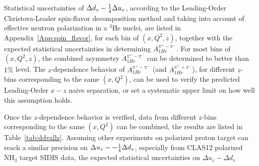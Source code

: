 Statistical uncertainties of $\Delta d_v-{1 \over 4} \Delta u_v$, according to the Leading-Order Christova-Leader spin-flavor decomposition method and taking into account of effective neutron polarization in a $^3$He nuclei, are listed in Appendix~\ref{App:spin_flavor}, for each bin of $(x, Q^2, z)$, together with the expected statistical uncertainties in determining  $A_{1He}^{\pi^+ - \pi^-}$. For most bins of $(x, Q^2, z)$, the combined asymmetry $A_{1He}^{\pi^+ - \pi^-}$ can be determined to better than $1\%$ level. The $z$-dependence behavior of  $A_{1He}^{\pi^+ - \pi^-}$ (and $A_{1He}^{\pi^+ + \pi^-}$), for different $z$-bins corresponding to the same $(x,Q^2)$, can be used to verify the predicted Leading-Order $x-z$ naive separation, or set a systematic upper limit on how well this assumption holds. 

Once the $z$-dependence behavior is verified, data from different $z$-bins corresponding to the same $(x,Q^2)$ can be combined, the results are  listed in Table~\ref{tab:ddvallz}. 
Assuming other experiments  on polarized proton target can reach a similar  precision on  $\Delta u_v--{1 \over 4} \Delta d_v$,  especially from CLAS12 polarized NH$_3$ target SIDIS data,  the expected statistical uncertainties on $\Delta u_v -\Delta d_v$ 

